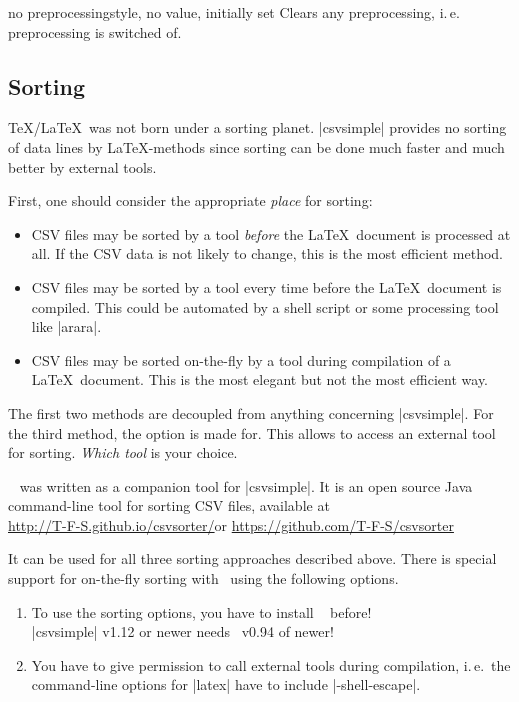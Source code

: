 \documentclass[a4paper,11pt]{ltxdoc}
\begin{document}
\begin{docCsvKey}{no preprocessing}{}{style, no value, initially set}
  Clears any preprocessing, i.\,e. preprocessing is switched of.
\end{docCsvKey}



\clearpage
\subsection{Sorting}\label{sec:Sorting}%
\TeX/\LaTeX\ was not born under a sorting planet. |csvsimple| provides no
sorting of data lines by \LaTeX-methods since sorting can be done much faster
and much better by external tools.

First, one should consider the appropriate \emph{place} for sorting:
\begin{itemize}
\item CSV files may be sorted by a tool \emph{before} the \LaTeX\ document is processed
  at all. If the CSV data is not likely to change, this is the most efficient method.
\item CSV files may be sorted by a tool every time before the \LaTeX\ document is compiled.
  This could be automated by a shell script or some processing tool like |arara|.
\item CSV files may be sorted on-the-fly by a tool during compilation of
  a \LaTeX\ document. This is the most elegant but not the most efficient way.
\end{itemize}

The first two methods are decoupled from anything concerning |csvsimple|.
For the third method, the  option is made for.
This allows to access an external tool for sorting.
\emph{Which tool} is your choice.

\csvsorter\ \cite{sturm:2014j}
was written as a companion tool for |csvsimple|.
It is an open source Java command-line tool for sorting CSV files, available at\\
\url{http://T-F-S.github.io/csvsorter/}\quad or\quad
\url{https://github.com/T-F-S/csvsorter}

It can be
used for all three sorting approaches described above.
There is special support for on-the-fly sorting with \csvsorter\ using the
following options.

\begin{enumerate}\bfseries
\item To use the sorting options, you have to install \csvsorter\ \cite{sturm:2014j} before!\\
  |csvsimple| v1.12 or newer needs \csvsorter\ v0.94 of newer!
\item You have to give permission to call external tools during
  compilation, i.\,e.\ the command-line options for |latex| have to include
  |-shell-escape|.
\end{enumerate}
\end{document}

